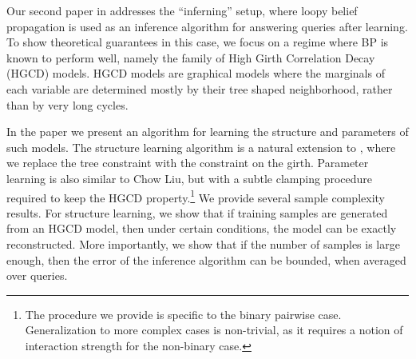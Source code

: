 
Our second paper in  addresses the ``inferning'' setup, where loopy belief propagation is used as an inference algorithm for answering queries after learning.  
To show theoretical guarantees in this case, we focus on a regime where BP is known to perform well, 
namely the family of High Girth Correlation Decay (HGCD) models. HGCD models are graphical models where the marginals of each variable are determined mostly by their tree shaped neighborhood, rather than by very long cycles. 

In the paper we present an algorithm for learning the structure and parameters of such models.
The structure learning algorithm is a natural extension to \cite{chowLiu}, where we replace the tree constraint with the constraint on the girth.
Parameter learning is also similar to Chow Liu, but with a subtle clamping procedure required to keep the HGCD property.\footnote{The procedure we provide is specific to the binary pairwise case. Generalization to more complex cases is non-trivial, as it requires a notion of interaction strength for the non-binary case.}
We provide several sample complexity results. 
For structure learning, we show that if training samples are generated from an HGCD model, then under certain conditions, the model can be exactly reconstructed.
More importantly, we show that if the number of samples is large enough, then the error of the inference algorithm can be bounded, when averaged over queries.


